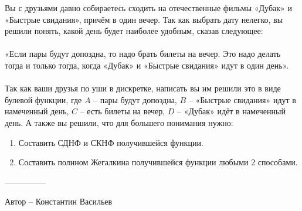 \question
Вы с друзьями давно собираетесь сходить на отечественные фильмы «Дубак» и «Быстрые свидания», причём в один вечер. Так как выбрать дату нелегко, вы решили понять, какой день будет наиболее удобным, сказав следующее:
\\
\\
«Если пары будут допоздна, то надо брать билеты на вечер. Это надо делать тогда и только тогда, когда «Дубак» и «Быстрые свидания» идут в один день».
\\
\\
Так как ваши друзья по уши в дискретке, написать вы им решили это в виде булевой функции, где $A$ – пары будут допоздна, $B$ – «Быстрые свидания» идут в намеченный день, $C$ – есть билеты на вечер, $D$ – «Дубак» идёт в намеченный день. А также вы решили, что для большего понимания нужно:
\begin{enumerate}
    \item Составить СДНФ и СКНФ получившейся функции.
    \item Составить полином Жегалкина получившейся функции любыми 2 способами.
\end{enumerate}

---------------

Автор -- Константин Васильев